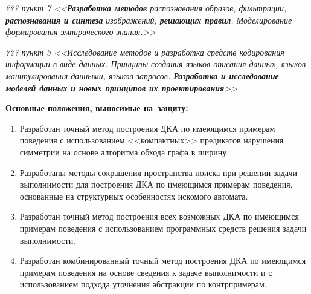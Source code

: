 \emph{??? пункт 7 <<\textbf{Разработка методов} распознавания образов, фильтрации, \textbf{распознавания и синтеза} изображений, \textbf{решающих правил}. Моделирование формирования эмпирического знания.>>}

\emph{??? пункт 3 <<Исследование методов и разработка средств кодирования информации в виде данных. Принципы создания языков описания данных, языков манипулирования данными, языков запросов. \textbf{Разработка и исследование моделей данных и новых принципов их проектирования}>>.}

\textbf{Основные положения, выносимые на~защиту:}
\begin{enumerate}
  \item Разработан точный метод построения ДКА по имеющимся примерам поведения с использованием <<компактных>> предикатов нарушения симметрии на основе алгоритма обхода графа в ширину.
  \item Разработаны методы сокращения пространства поиска при решении задачи выполнимости для построения ДКА по имеющимся примерам поведения, основанные на структурных особенностях искомого автомата.
  \item Разработан точный метод построения всех возможных ДКА по имеющимся примерам поведения с использованием программных средств решения задачи выполнимости.
  \item Разработан комбинированный точный метод построения ДКА по имеющимся примерам поведения на основе сведения к задаче выполнимости и с использованием подхода уточнения абстракции по контрпримерам.
\end{enumerate}

